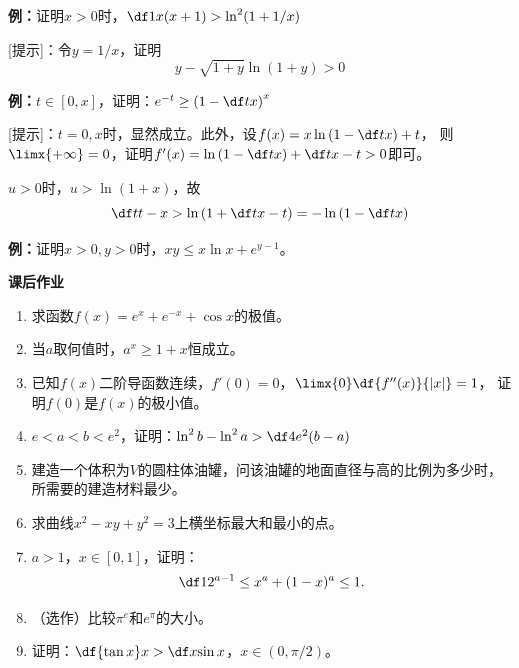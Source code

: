 {\bf 例：}证明$x>0$时，$\df1{x(x+1)}>\ln^2(1+1/x)$

[提示]：令$y=1/x$，证明
$$y-\sqrt{1+y}\ln(1+y)>0$$

% 

{\bf 例：}$t\in[0,x]$，证明：$e^{-t}\geq\left(1-\df tx\right)^x$

[提示]：$t=0,x$时，显然成立。此外，设$f(x)=x\ln\left(1-\df tx\right)+t$，
则$\limx{+\infty}=0$，证明$f'(x)=\ln\left(1-\df tx\right)+\df t{x-t}>0$即可。

$u>0$时，$u>\ln(1+x)$，故
$$\df t{t-x}>\ln\left(1+\df t{x-t}\right)=-\ln\left(1-\df tx\right)$$

% 

{\bf 例：}证明$x>0,y>0$时，$xy\leq x\ln x+e^{y-1}$。

\begin{ext}
	{\bf 课后作业}
	
	\begin{enumerate}
	  \item 求函数$f(x)=e^x+e^{-x}+\cos x$的极值。
	  \item 当$a$取何值时，$a^x\geq1+x$恒成立。
	  \item 已知$f(x)$二阶导函数连续，$f'(0)=0$，$\limx{0}\df{f''(x)}{|x|}=1$，
	  证明$f(0)$是$f(x)$的极小值。
	  \item $e<a<b<e^2$，证明：$\ln^2b-\ln^2a>\df4{e^2}(b-a)$
	  \item 建造一个体积为$V$的圆柱体油罐，问该油罐的地面直径与高的比例为多少时，
	  所需要的建造材料最少。
	  \item 求曲线$x^2-xy+y^2=3$上横坐标最大和最小的点。
	  \item $a>1$，$x\in[0,1]$，证明：
	  $$\df1{2^{a-1}}\leq x^a+(1-x)^a\leq 1.$$
	  \item （选作）比较$\pi^e$和$e^{\pi}$的大小。
	  \item 证明：$\df{\tan x}x>\df x{\sin x}$，$x\in(0,\pi/2)$。
	\end{enumerate}
\end{ext}

